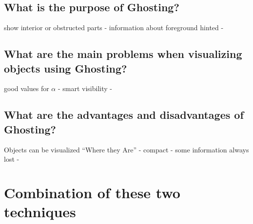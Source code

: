 \subsection{What is the purpose of Ghosting?}
show interior or obstructed parts - information about foreground hinted - 
\subsection{What are the main problems when visualizing objects using Ghosting?}
good values for $\alpha$ - smart visibility - 

\subsection{What are the advantages and disadvantages of Ghosting?}
Objects can be visualized ``Where they Are'' - compact - some information always lost -
\section{Combination of these two techniques}
